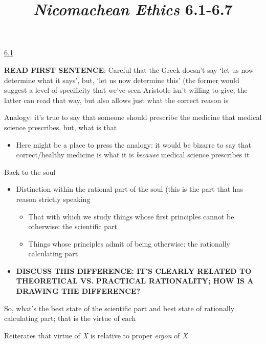 \documentclass[11pt]{article}
\title{\emph{Nicomachean Ethics} 6.1-6.7}
\author{}
\date{}
\begin{document}
\maketitle

\noindent\underline{6.1}
\vspace*{4mm}

\noindent\textbf{READ FIRST SENTENCE}: Careful that the Greek doesn't say `let us now determine what it says', but, `let us now determine this' (the former would suggest a level of specificity that we've seen Aristotle isn't willing to give; the latter can read that way, but also allows just what the correct reason is
\vspace*{2mm}

\noindent Analogy: it's true to say that someone should prescribe the medicine that medical science prescribes, but, what is that

\begin{itemize}\item{Here might be a place to press the analogy: it would be bizarre to say that correct/healthy medicine is what it is \emph{because} medical science prescribes it}\end{itemize}

\noindent Back to the soul

\begin{itemize}\item{Distinction within the rational part of the soul (this is the part that has reason strictly speaking}\begin{itemize}\item{That with which we study things whose first principles cannot be otherwise: the scientific part}\item{Things whose principles admit of being otherwise: the rationally calculating part}\end{itemize}\item{\textbf{DISCUSS THIS DIFFERENCE: IT'S CLEARLY RELATED TO THEORETICAL VS. PRACTICAL RATIONALITY; HOW IS A DRAWING THE DIFFERENCE?}}\end{itemize}

\noindent So, what's the best state of the scientific part and best state of rationally calculating part; that is the virtue of each
\vspace*{2mm}

\noindent Reiterates that virtue of \emph{X} is relative to proper \emph{ergon} of \emph{X}
\vspace*{2mm}
\end{document}
